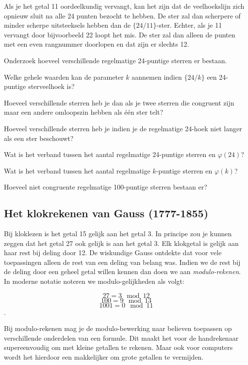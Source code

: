Als je het getal 11 oordeelkundig vervangt, kan het zijn dat de veelhoekslijn zich opnieuw sluit na alle 24 punten bezocht te hebben. De ster zal dan scherpere of minder scherpe uitsteeksels hebben dan de $\{24/11\}$-ster. Echter, als je 11 vervangt door bijvoorbeeld 22 loopt het mis. De ster zal dan alleen de punten met een even rangnummer doorlopen en dat zijn er slechts 12.

\begin{oef}
Onderzoek hoeveel verschillende regelmatige 24-puntige sterren er bestaan.

\begin{enumoef}
\item Welke gehele waarden kan de parameter $k$ aannemen indien $\{24/k\}$ een 24-puntige sterveelhoek is?
\item Hoeveel verschillende sterren heb je dan als je twee sterren die congruent zijn maar een andere omloopszin hebben als één ster telt?
\item Hoeveel verschillende sterren heb je indien je de regelmatige 24-hoek niet langer als een ster beschouwt?
\item Wat is het verband tussen het aantal regelmatige 24-puntige sterren en $\varphi(24)$?
\item Wat is het verband tussen het aantal regelmatige $k$-puntige sterren en $\varphi(k)$?
\item Hoeveel niet congruente regelmatige 100-puntige sterren bestaan er?
\end{enumoef}
\end{oef}

\subsection{Het klokrekenen van Gauss (1777-1855)}

Bij kloklezen is het getal 15 gelijk aan het getal 3.  In principe zou je kunnen zeggen dat het getal 27 ook gelijk is aan het getal 3. Elk klokgetal is gelijk aan haar rest bij deling door 12. De wiskundige Gauss ontdekte dat voor vele toepassingen alleen de rest van een deling van belang was. Indien we de rest bij de deling door een geheel getal willen kennen dan doen we aan \emph{modulo-rekenen}. In moderne notatie noteren we modulo-gelijkheden als volgt:

\[27=3 \mod 12\]
\[100=9 \mod 13\]
\[1001=0 \mod 11\].

Bij modulo-rekenen mag je de modulo-bewerking naar believen toepassen op verschillende onderdelen van een formule. Dit maakt het voor de handrekenaar supereenvoudig om met kleine getallen te rekenen. Maar ook voor computers wordt het hierdoor een makkelijker om grote getallen te vermijden.

